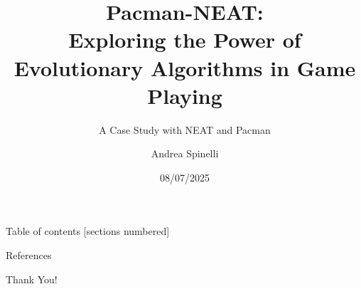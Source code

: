 \documentclass[11pt]{beamer}
\title[NEAT]{\vspace {2em}Pacman-NEAT: \\ Exploring the Power of Evolutionary Algorithms in Game Playing}
\subtitle{A Case Study with NEAT and Pacman}
\date{08/07/2025}
\author{Andrea Spinelli}
\institute{\vspace{-5em} University of Trieste \hfill \texttt{[image: assets/pacman.png]}}
\begin{document}
\maketitle

\begin{frame}{Table of contents}
  [sections numbered]
  \tableofcontents%
\end{frame}



% 
% 

\begin{frame}[allowframebreaks]{References}

  
  
  
\end{frame}

{
\begin{frame}[standout]
  \fontsize{18pt}{16pt}\selectfont
  Thank You!
\end{frame}
}
\end{document}
